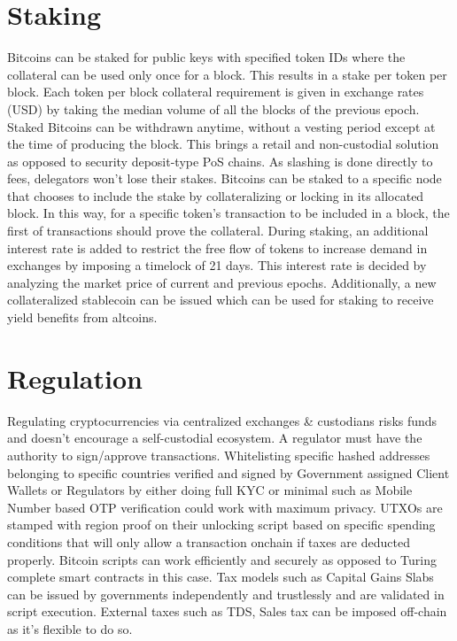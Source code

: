 \documentclass[a4paper,10pt]{article}
\begin{document}
\section{Staking}
Bitcoins can be staked for public keys with specified token IDs where the collateral can be used only once for a block. This results in a stake per token per block. Each token per block collateral requirement is given in exchange rates (USD) by taking the median volume of all the blocks of the previous epoch. Staked Bitcoins can be withdrawn anytime, without a vesting period except at the time of producing the block. This brings a retail and non-custodial solution as opposed to security deposit-type PoS chains. As slashing is done directly to fees, delegators won't lose their stakes. Bitcoins can be staked to a specific node that chooses to include the stake by collateralizing or locking in its allocated block. In this way, for a specific token's transaction to be included in a block, the first of transactions should prove the collateral. During staking, an additional interest rate is added to restrict the free flow of tokens to increase demand in exchanges by imposing a timelock of 21 days. This interest rate is decided by analyzing the market price of current and previous epochs. Additionally, a new collateralized stablecoin can be issued which can be used for staking to receive yield benefits from altcoins. 
\section{Regulation}
Regulating cryptocurrencies via centralized exchanges \& custodians risks funds and doesn't encourage a self-custodial ecosystem. A regulator must have the authority to sign/approve transactions. Whitelisting specific hashed addresses belonging to specific countries verified and signed by Government assigned Client Wallets or Regulators by either doing full KYC or minimal such as Mobile Number based OTP verification could work with maximum privacy. UTXOs are stamped with region proof on their unlocking script based on specific spending conditions that will only allow a transaction onchain if taxes are deducted properly. Bitcoin scripts can work efficiently and securely as opposed to Turing complete smart contracts in this case. Tax models such as Capital Gains Slabs can be issued by governments independently and trustlessly and are validated in script execution. External taxes such as TDS, Sales tax can be imposed off-chain as it's flexible to do so.
\end{document}
